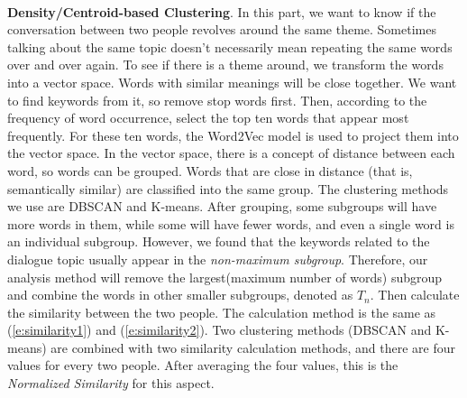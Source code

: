 \documentclass[a4paper,12pt]{report}
\begin{document}
\paragraph{}
\textbf{Density/Centroid-based Clustering}. In this part, we want to know if the conversation between two people revolves around the same theme. Sometimes talking about the same topic doesn't necessarily mean repeating the same words over and over again. To see if there is a theme around, we transform the words into a vector space. Words with similar meanings will be close together. We want to find keywords from it, so remove stop words first. Then, according to the frequency of word occurrence, select the top ten words that appear most frequently. For these ten words, the Word2Vec model is used to project them into the vector space. In the vector space, there is a concept of distance between each word, so words can be grouped. Words that are close in distance (that is, semantically similar) are classified into the same group. The clustering methods we use are DBSCAN and K-means. After grouping, some subgroups will have more words in them, while some will have fewer words, and even a single word is an individual subgroup. However, we found that the keywords related to the dialogue topic usually appear in the \emph{non-maximum subgroup}. Therefore, our analysis method will remove the largest(maximum number of words) subgroup and combine the words in other smaller subgroups, denoted as $T_n$. Then calculate the similarity between the two people. The calculation method is the same as (\ref{e:similarity1}) and (\ref{e:similarity2}). Two clustering methods (DBSCAN and K-means) are combined with two similarity calculation methods, and there are four values for every two people. After averaging the four values, this is the \emph{Normalized Similarity} for this aspect.
\end{document}
